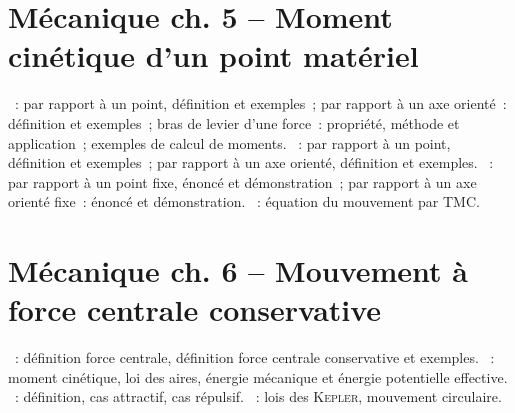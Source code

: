 \documentclass[a4paper, 12pt, final, garamond]{book}
\begin{document}
\section*{Mécanique ch. 5 -- Moment cinétique d'un point matériel}
\begin{enumerate}[label=\Roman*]
    ~: par rapport à un point, définition et exemples~;
        par rapport à un axe orienté~: définition et exemples~; bras de levier
        d'une force~: propriété, méthode et application~; exemples de calcul de
        moments.
    ~: par rapport à un point, définition et exemples~;
        par rapport à un axe orienté, définition et exemples.
    ~: par rapport à un point fixe, énoncé et
        démonstration~; par rapport à un axe orienté fixe~: énoncé et
        démonstration.
    ~: équation du mouvement par TMC.
\end{enumerate}

\section*{Mécanique ch. 6 -- Mouvement à force centrale conservative}
\begin{enumerate}[label=\Roman*]
    ~: définition force centrale,
        définition force centrale conservative et exemples.
    ~: moment cinétique, loi des aires, énergie
        mécanique et énergie potentielle effective.
    ~: définition, cas attractif, cas répulsif.
    ~: lois des \textsc{Kepler}, mouvement circulaire.
\end{enumerate}
\end{document}
